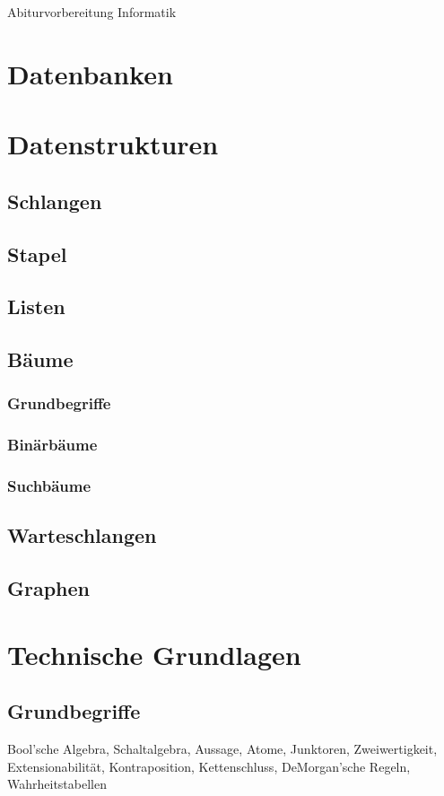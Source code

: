 \documentclass{article}
\begin{document}
\begin{titlepage}
    \begin{center}
        \Huge Abiturvorbereitung Informatik
    \end{center}
\end{titlepage}
\tableofcontents
\pagebreak
\section{Datenbanken}
\section{Datenstrukturen}
\subsection{Schlangen}
\subsection{Stapel}
\subsection{Listen}
\subsection{Bäume}
\subsubsection{Grundbegriffe}
\subsubsection{Binärbäume}
\subsubsection{Suchbäume}
\subsection{Warteschlangen}
\subsection{Graphen}
\section{Technische Grundlagen}
\subsection{Grundbegriffe}
Bool'sche Algebra, Schaltalgebra, Aussage, Atome, Junktoren, Zweiwertigkeit, Extensionabilität, Kontraposition, Kettenschluss, DeMorgan'sche Regeln, Wahrheitstabellen
\end{document}

